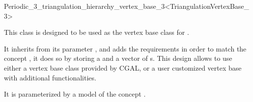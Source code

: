 

\begin{ccRefClass}{Periodic_3_triangulation_hierarchy_vertex_base_3<TriangulationVertexBase_3>}

\ccDefinition
  
This class is designed to be used as the vertex base class for
.

It inherits from its parameter , and adds the
requirements in order to match the concept
, it does so by
storing a  and a vector of s.
This design allows to use either a vertex base class
provided by CGAL, or a user customized vertex base with additional
functionalities.


\ccParameters

It is parameterized by a model of the concept .

\ccIsModel {}

\ccInheritsFrom {}


\ccSeeAlso
{}\\
\\

\end{ccRefClass}
